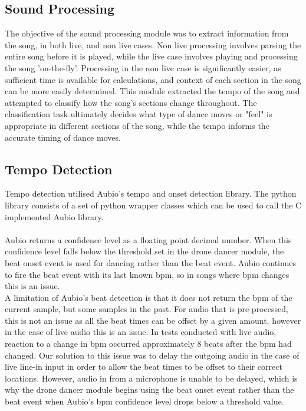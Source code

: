 \subsection{Sound Processing}



The objective of the sound processing module was to extract information from the song, in both live, and non live cases. Non live processing involves parsing the entire song before it is played, while the live case involves playing and processing the song 'on-the-fly'. Processing in the non live case is significantly easier, as sufficient time is available for calculations, and context of each section in the song can be more easily determined. This module extracted the tempo of the song and attempted to classify how the song's sections change throughout. The classification task ultimately decides what type of dance moves or "feel" is appropriate in different sections of the song, while the tempo informs the accurate timing of dance moves.

\subsection{Tempo Detection}
Tempo detection utilised Aubio's tempo and onset detection library. The python library consists of a set of python wrapper classes which can be used to call the C implemented Aubio library. \\
\\
Aubio returns a confidence level as a floating point decimal number. When this confidence level falls below the
threshold set in the drone dancer module, the beat onset event is used for dancing rather than the beat event.
Aubio continues to fire the beat event with its last known bpm, so in songs where bpm changes this is an issue.
\\
A limitation of Aubio's beat detection is that it does not return the bpm of the current sample, but some samples
in the past. For audio that is pre-processed, this is not an issue as all the beat times can be offset by a given
amount, however in the case of live audio this is an issue. In tests conducted with live audio, reaction to a
change in bpm occurred approximately 8 beats after the bpm had changed. Our solution to this issue was to delay
the outgoing audio in the case of live line-in input in order to allow the beat times to be offset to their
correct locations. However, audio in from a microphone is unable to be delayed, which is why the drone dancer
module begins using the beat onset event rather than the beat event when Aubio's bpm confidence level drops below
a threshold value.

